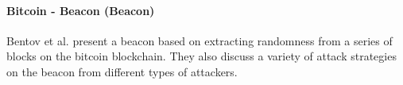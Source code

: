 \paragraph{Bitcoin - Beacon (\pi Beacon) } 
Bentov et al. \cite{bentov2016bitcoin} present a beacon based on extracting randomness from a series of blocks on the bitcoin blockchain. They also discuss a variety of attack strategies on the beacon from different types of attackers.  